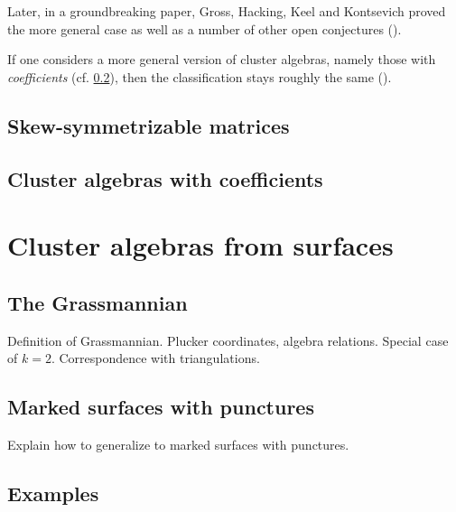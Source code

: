 Later, in a groundbreaking paper, Gross, Hacking, Keel and Kontsevich proved the more
general case as well as a number of other open conjectures
(\cite{GrossHackingKeelKontsevich2018CanonicalBCA}).

If one considers a more general version of cluster algebras, namely those with
\emph{coefficients} (cf. \cref{sec:cluster_algebras_coefficients}), then the
classification stays roughly the same (\cite{FeliksonPavel2023cluster}).

\subsection{Skew-symmetrizable matrices}
\subsection{Cluster algebras with coefficients}\label{sec:cluster_algebras_coefficients}

\section{Cluster algebras from surfaces}\label{sec:cluster_algebras_surfaces}

\subsection{The Grassmannian}

Definition of Grassmannian. Plucker coordinates, algebra relations. Special case of
$k=2$. Correspondence with triangulations.
\subsection{Marked surfaces with punctures}\label{sec:triangulations_of_surfaces}
Explain how to generalize to marked surfaces with punctures.
\subsection{Examples}
